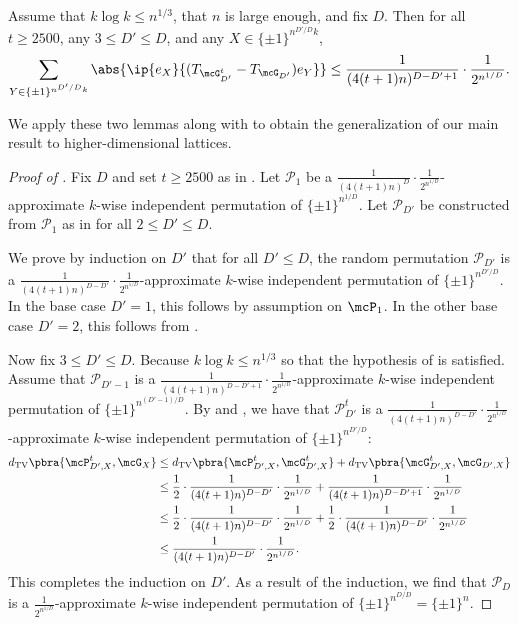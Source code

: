 \begin{lemma}
    \label{lem:genmaintrick}
    Assume that $k\log k\leq n^{1/3}$, that $n$ is large enough, and fix $D$. Then for all $t \geq 2500$, any $3\leq D'\leq D$, and any $X \in \{\pm1\}^{n^{D'/D}k}$,
    \begin{equation*}
        \sum_{Y \in \{\pm1\}^{n^{D'/D}k}} \abs{\ip{e_X}{(T_{\mcG^t_{D'}}-T_{\mcG_{D'}}) e_Y}} \leq \frac{1}{(4(t+1)n)^{D-D'+1}}\cdot\frac1{2^{n^{1/D}}}.
    \end{equation*}
\end{lemma}

We apply these two lemmas along with  to obtain the generalization of our main result to higher-dimensional lattices. 

\begin{proof}[Proof of ]
    Fix $D$ and set $t\geq 2500$ as in . Let $\mathcal{P}_1$ be a $\frac1{(4(t+1)n)^D}\cdot \frac1{2^{n^{1/D}}}$-approximate $k$-wise independent permutation of $\{\pm1\}^{n^{1/D}}$. Let $\mathcal{P}_{D'}$ be constructed from $\mathcal{P}_1$ as in  for all $2\leq D'\leq D$.

    We prove by induction on $D'$ that for all $D'\leq D$, the random permutation $\mathcal{P}_{D'}$ is a $\frac1{(4(t+1)n)^{D-D'}}\cdot\frac1{2^{n^{1/D}}}$-approximate $k$-wise independent permutation of $\{\pm1\}^{n^{D'/D}}$. In the base case $D'=1$, this follows by assumption on $\mcP_1$. In the other base case $D'=2$, this follows from . 

    Now fix $3\leq D'\leq D$. Because $k\log k\leq n^{1/3}$ so that the hypothesis of  is satisfied. Assume that $\mathcal{P}_{D'-1}$ is a $\frac1{(4(t+1)n)^{D-D'+1}}\cdot\frac1{2^{n^{1/D}}}$-approximate $k$-wise independent permutation of $\{\pm1\}^{n^{(D'-1)/D}}$. By  and , we have that $\mathcal{P}_{D'}^t$ is a $\frac1{(4(t+1)n)^{D-D'}}\cdot\frac1{2^{n^{1/D}}}$-approximate $k$-wise independent permutation of $\{\pm1\}^{n^{D'/D}}$:
    \begin{align*}
        d_{\textrm{TV}}\pbra{\mcP^t_{D', X}, \mcG_X} &\leq d_{\textrm{TV}}\pbra{\mcP^t_{D',X}, \mcG^t_{D',X}} + d_{\textrm{TV}}\pbra{\mcG^t_{D', X}, \mcG_{D',X}}\\
        &\leq \frac12\cdot\frac1{(4(t+1)n)^{D-D'}}\cdot\frac1{2^{n^{1/D}}}+\frac{1}{(4(t+1)n)^{D-D'+1}}\cdot\frac1{2^{n^{1/D}}}\\
        &\leq \frac12\cdot\frac1{(4(t+1)n)^{D-D'}}\cdot\frac1{2^{n^{1/D}}}+\frac12\cdot\frac{1}{(4(t+1)n)^{D-D'}}\cdot\frac1{2^{n^{1/D}}}\\
        &\leq\frac1{(4(t+1)n)^{D-D'}}\cdot\frac1{2^{n^{1/D}}}.
    \end{align*}
    This completes the induction on $D'$. As a result of the induction, we find that $\mathcal{P}_D$ is a $\frac1{2^{n^{1/D}}}$-approximate $k$-wise independent permutation of $\{\pm1\}^{n^{D/D}}=\{\pm1\}^{n}$.



\end{proof}
